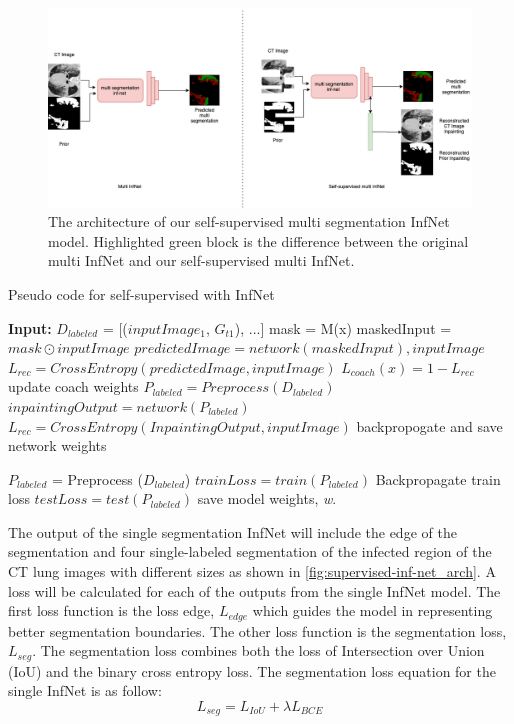 \begin{figure}
	\centering
	\includegraphics[width=\linewidth]{self-super-multi-inf-net.png}
	\caption{The architecture of our self-supervised multi segmentation InfNet model. Highlighted green block is the difference between the original multi InfNet and our self-supervised multi InfNet.}
	\label{fig:multi-inf-net_arch}
\end{figure}

\begin{algorithm}
	\caption{Pseudo code for self-supervised with InfNet}
	\label{alg:self-inf-net}
	\begin{algorithmic}
		\STATE \textbf{Input:} $D_{labeled}$ = [($inputImage_1$, $G_{t1}$), ...]
		\STATE mask = M(x)
		\STATE maskedInput = $mask \odot inputImage$
		\STATE $ predictedImage =network(maskedInput), inputImage$
		\STATE $L_{rec} = CrossEntropy(predictedImage, inputImage)$
		\STATE $L_{coach}(x) = 1 - L_{rec}$
		\STATE update coach weights
		\ENDFOR
		\STATE $P_{labeled} = Preprocess(D_{labeled})$
		\STATE $inpaintingOutput = network(P_{labeled})$
		\STATE $L_{rec} = CrossEntropy(InpaintingOutput, inputImage)$
		\STATE backpropogate and save network weights
		\ENDFOR
		\ENDFOR 
		
		
		\STATE $P_{labeled}$ = Preprocess ($D_{labeled}$)
		\STATE $trainLoss = train(P_{labeled})$
		\STATE Backpropagate train loss
		\STATE $testLoss = test(P_{labeled})$
		\STATE save model weights, \textit{w}.
		\ENDFOR
	\end{algorithmic}
\end{algorithm}

The output of the single segmentation InfNet will include the edge of the segmentation and four single-labeled segmentation of the infected region of the CT lung images with different sizes as shown in \ref{fig:supervised-inf-net_arch}. A loss will be calculated for each of the outputs from the single InfNet model. The first loss function is the loss edge, $L_{edge}$ which guides the model in representing better segmentation boundaries. The other loss function is the segmentation loss, ${L_{seg}}$. The segmentation loss combines both the loss of Intersection over Union (IoU) and the binary cross entropy loss. The segmentation loss equation for the single InfNet is as follow:
\begin{equation}
L_{seg} = L_{IoU} + \lambda L_{BCE}
\end{equation}

